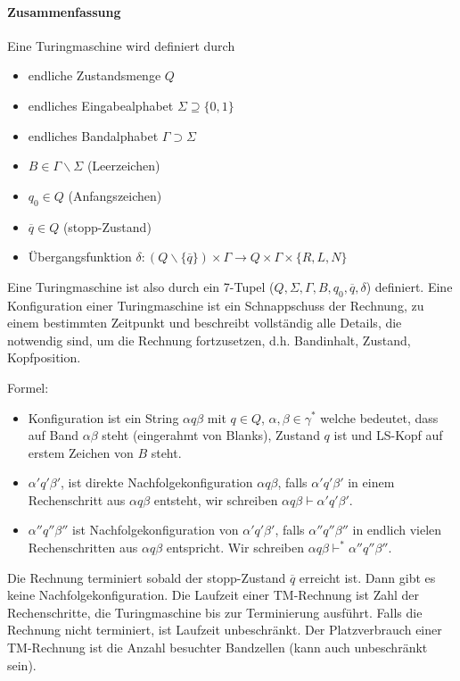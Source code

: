\paragraph*{Zusammenfassung} Eine Turingmaschine wird definiert durch
\begin{itemize}
	\item endliche Zustandsmenge $Q$
	\item endliches Eingabealphabet $\Sigma \supseteq \{ 0,1 \}$
	\item endliches Bandalphabet $\Gamma \supset \Sigma$
	\item $B \in \Gamma\backslash\Sigma$ (Leerzeichen)
	\item $q_0 \in Q$ (Anfangszeichen)
	\item $\overline{q} \in Q$ (stopp-Zustand)
	\item Übergangsfunktion $\delta : (Q \backslash \{ \overline{q} \}) \times \Gamma \rightarrow Q \times \Gamma \times \{ R,L,N \}$
\end{itemize}

\par\medskip Eine Turingmaschine ist also durch ein 7-Tupel ($Q,\Sigma,\Gamma,B,q_0,\overline{q},\delta$) definiert. Eine Konfiguration einer Turingmaschine ist ein Schnappschuss der Rechnung, zu einem bestimmten Zeitpunkt und beschreibt vollständig alle Details, die notwendig sind, um die Rechnung fortzusetzen, d.h. Bandinhalt, Zustand, Kopfposition.\par

\medskip Formel:
\begin{itemize}
	\item Konfiguration ist ein String $\alpha q \beta$ mit $q \in Q$, $\alpha,\beta \in \gamma^*$ welche bedeutet, dass auf Band $\alpha\beta$ steht (eingerahmt von Blanks), Zustand $q$ ist und LS-Kopf auf erstem Zeichen von $B$ steht.
	\item $\alpha'q'\beta'$, ist direkte Nachfolgekonfiguration $\alpha q \beta$, falls $\alpha'q'\beta'$ in einem Rechenschritt aus $\alpha q \beta$ entsteht, wir schreiben $\alpha q \beta \vdash \alpha'q'\beta'$.
	\item $\alpha''q''\beta''$ ist Nachfolgekonfiguration von $\alpha'q'\beta'$, falls $\alpha''q''\beta''$ in endlich vielen Rechenschritten aus $\alpha q \beta$ entspricht. Wir schreiben $\alpha q \beta \vdash^* \alpha''q''\beta''$.
\end{itemize}

\par\medskip Die Rechnung terminiert sobald der stopp-Zustand $\overline{q}$ erreicht ist. Dann gibt es keine Nachfolgekonfiguration. Die Laufzeit einer TM-Rechnung ist Zahl der Rechenschritte, die Turingmaschine bis zur Terminierung ausführt. Falls die Rechnung nicht terminiert, ist Laufzeit unbeschränkt. Der Platzverbrauch einer TM-Rechnung ist die Anzahl besuchter Bandzellen (kann auch unbeschränkt sein).


